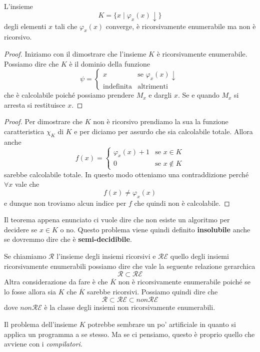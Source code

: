 \begin{theorem}
	L'insieme
	\[ K = \{ x \mid \varphi_x(x) \downarrow \} \]
	degli elementi $x$ tali che $\varphi_x (x)$ converge, è
	ricorsivamente enumerabile ma non è ricorsivo.
	\begin{proof}
		Iniziamo con il dimostrare che l'insieme $K$ è
		ricorsivamente enumerabile. Possiamo dire che $K$ è il
		dominio della funzione
		\[
			\psi = \begin{cases}
				x                 & \text{se } \varphi_x(x) \downarrow \\
				\text{indefinita} & \text{altrimenti}
			\end{cases}
		\]
		che è calcolabile poiché possiamo prendere $M_x$ e
		dargli $x$. Se e quando $M_x$ si arresta si restituisce
		$x$.
	\end{proof}
	\begin{proof}
		Per dimostrare che $K$ non è ricorsivo prendiamo la sua
		la funzione caratteristica $\chi_K$ di $K$ e per diciamo
		per assurdo che sia calcolabile totale. Allora anche
		\[
			f(x) = \begin{cases}
				\varphi_x (x) + 1 & \text{se } x \in K    \\
				0                 & \text{se } x \notin K
			\end{cases}
		\]
		sarebbe calcolabile totale. In questo modo otteniamo una
		contraddizione perché $\forall x$ vale che
		\[ f(x) \neq \varphi_x (x) \]
		e dunque non troviamo alcun indice per $f$ che quindi
		non è calcolabile.
	\end{proof}
\end{theorem}

Il teorema appena enunciato ci vuole dire che non esiste un
algoritmo per decidere se $x \in K$ o no. Questo problema viene
quindi definito \textbf{insolubile} anche se dovremmo dire che
è \textbf{semi-decidibile}.

Se chiamiamo $\mathcal{R}$ l'insieme degli insiemi ricorsivi e
$\mathcal{RE}$ quello degli insiemi ricorsivamente enumerabili
possiamo dire che vale la seguente relazione gerarchica
\[ \mathcal{R} \subset	\mathcal{RE} \]
Altra considerazione da fare è che $\overline{K}$ non è
ricorsivamente enumerabile poiché se lo fosse allora sia $K$
che $\overline{K}$ sarebbe ricorsivi. Possiamo quindi dire che
\[ \mathcal{R} \subset \mathcal{RE} \subset non\mathcal{RE} \]
dove $non \mathcal{RE}$ è la classe degli insiemi non
ricorsivamente enumerabili.

Il problema dell'insieme $K$ potrebbe sembrare un po' artificiale
in quanto si applica un programma a se stesso. Ma se ci pensiamo,
questo è proprio quello che avviene con i \emph{compilatori}.

